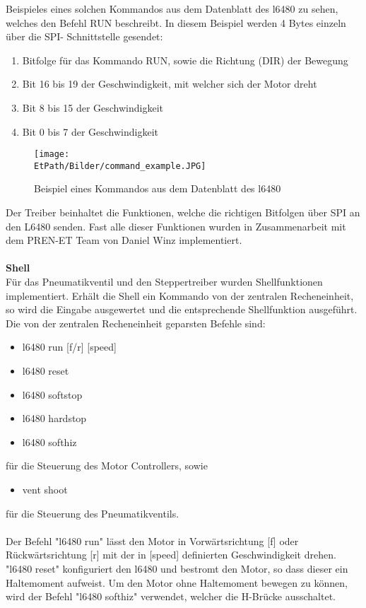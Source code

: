     Beispieles eines solchen Kommandos aus dem Datenblatt des l6480 zu sehen, 
    welches den Befehl RUN beschreibt. In diesem Beispiel werden 4 Bytes 
    einzeln über die SPI- Schnittstelle gesendet: 
    \begin{enumerate}
        \item Bitfolge für das Kommando RUN, sowie die Richtung (DIR) der Bewegung
        \item Bit 16 bis 19 der Geschwindigkeit, mit welcher sich der Motor dreht
        \item Bit 8 bis 15 der Geschwindigkeit
        \item Bit 0 bis 7 der Geschwindigkeit
    \end{enumerate}
    \begin{figure}[h!]
        \centering
        \texttt{[image: \\EtPath/Bilder/command\_example.JPG]}
        \caption{Beispiel eines Kommandos aus dem Datenblatt des l6480}
        \label{fig:command}
    \end{figure}
    Der Treiber beinhaltet die Funktionen, welche die richtigen Bitfolgen über 
    SPI an den L6480 senden. Fast alle dieser Funktionen wurden in 
    Zusammenarbeit mit dem PREN-ET Team von Daniel Winz implementiert.  
    \\\\
    \textbf{Shell}\\
    Für das Pneumatikventil und den Steppertreiber wurden Shellfunktionen 
    implementiert. Erhält die Shell ein Kommando von der zentralen 
    Recheneinheit, so wird die Eingabe ausgewertet und die entsprechende 
    Shellfunktion ausgeführt. Die von der zentralen Recheneinheit geparsten 
    Befehle sind:  
    \begin{itemize}
        \item l6480 run [f/r] [speed]
        \item l6480 reset
        \item l6480 softstop
        \item l6480 hardstop
        \item l6480 softhiz
    \end{itemize}
    für die Steuerung des Motor Controllers, sowie
    \begin{itemize}
        \item vent shoot
    \end{itemize}
    für die Steuerung des Pneumatikventils. 
    \\\\
    Der Befehl "l6480 run" lässt den Motor in Vorwärtsrichtung [f] oder 
    Rückwärtsrichtung [r] mit der in [speed] definierten Geschwindigkeit 
    drehen. "l6480 reset" konfiguriert den l6480 und bestromt den Motor, so 
    dass dieser ein Haltemoment aufweist. Um den Motor ohne Haltemoment 
    bewegen zu können, wird der Befehl "l6480 softhiz" verwendet, welcher die 
    H-Brücke ausschaltet. 
    
